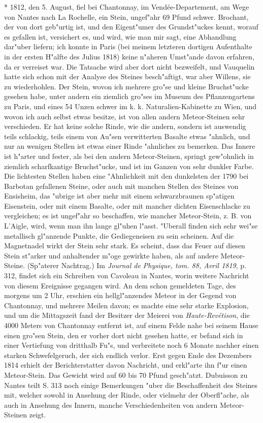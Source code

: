 \documentclass[a4paper, 11pt, oneside, polutonikogreek, german]{article}
\begin{document}
* 1812, den 5. August, fiel bei Chantonnay, im Vendée-Departement, am Wege von Nantes nach La Rochelle, ein Stein, ungef"ahr 69 Pfund schwer. Brochant, der von dort geb"urtig ist, und den Eigent"umer des Grundst"uckes kennt, worauf es gefallen ist, versichert es, und wird, wie man mir sagt, eine Abhandlung dar"uber liefern; ich konnte in Paris (bei meinem letzteren dortigen Aufenthalte in der ersten H"alfte des Julius 1818) keine n"aheren Umst"ande davon erfahren, da er verreiset war. Die Tatsache wird aber dort nicht bezweifelt, und Vauquelin hatte sich schon mit der Analyse des Steines besch"aftigt, war aber Willens, sie zu wiederhohlen. Der Stein, wovon ich mehrere gro"se und kleine Bruchst"ucke gesehen habe, unter andern ein ziemlich gro"ses im Museum des Pflanzengartens zu Paris, und eines 54 Unzen schwer im k. k. Naturalien-Kabinette zu Wien, und wovon ich auch selbst etwas besitze, ist von allen andern Meteor-Steinen sehr verschieden. Er hat keine solche Rinde, wie die andern, sondern ist auswendig teils schlackig, teils einem von Au"sen verwitterten Basalte etwas "ahnlich, und nur an wenigen Stellen ist etwas einer Rinde "ahnliches zu bemerken. Das Innere ist h"arter und fester, als bei den andern Meteor-Steinen, springt gew"ohnlich in ziemlich scharfkantige Bruchst"ucke, und ist im Ganzen von sehr dunkler Farbe. Die lichtesten Stellen haben eine "Ahnlichkeit mit den dunkelsten der 1790 bei Barbotan gefallenen Steine, oder auch mit manchen Stellen des Steines von Ensisheim, das "ubrige ist aber mehr mit einem schwarzbraunen sp"atigen Eisenstein, oder mit einem Basalte, oder mit mancher dichten Eisenschlacke zu vergleichen; es ist ungef"ahr so beschaffen, wie mancher Meteor-Stein, z. B. von L'Aigle, wird, wenn man ihn lange gl"uhen l"asst. "Uberall finden sich sehr wei"se metallisch gl"anzende Punkte, die Gediegeneisen zu sein scheinen. Auf die Magnetnadel wirkt der Stein sehr stark. Es scheint, dass das Feuer auf diesen Stein st"arker und anhaltender m"oge gewirkte haben, als auf andere Meteor-Steine. (Sp"aterer Nachtrag.) Im \emph{Journal de Physique, tom. 88, Avril 1819}, p. 312, findet sich ein Schreiben von Cavoleau in Nantes, worin weitere Nachricht von diesem Ereignisse gegangen wird. An dem schon gemeldeten Tage, des morgens um 2 Uhr, erschien ein hellgl"anzendes Meteor in der Gegend von Chantonnay, und mehrere Meilen davon; es machte eine sehr starke Explosion, und um die Mittagszeit fand der Besitzer der Meierei von \emph{Haute-Revétison}, die 4000 Meters von Chantonnay entfernt ist, auf einem Felde nahe bei seinem Hause einen gro"sen Stein, den er vorher dort nicht gesehen hatte, er befand sich in einer Vertiefung von dritthalb Fu"s, und verbreitete noch 6 Monate nachher einen starken Schwefelgeruch, der sich endlich verlor. Erst gegen Ende des Dezembers 1814 erhielt der Berichterstatter davon Nachricht, und erkl"arte ihn f"ur einen Meteor-Stein. Das Gewicht wird auf 60 bis 70 Pfund gesch"atzt. Dubuisson zu Nantes teilt S. 313 noch einige Bemerkungen "uber die Beschaffenheit des Steines mit, welcher sowohl in Ansehung der Rinde, oder vielmehr der Oberfl"ache, als auch in Ansehung des Innern, manche Verschiedenheiten von andern Meteor-Steinen zeigt.
\end{document}
